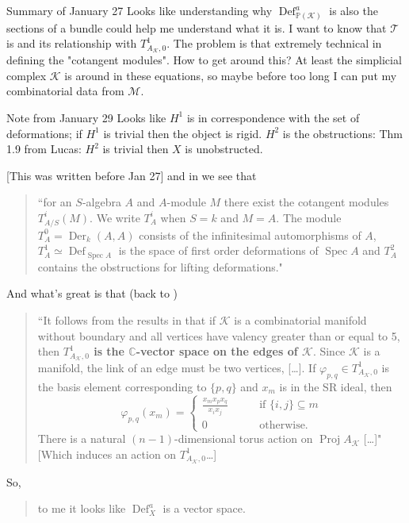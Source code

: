 \begin{thing2}{Summary of January 27}\leavevmode
Looks like understanding why \(\operatorname{Def}^a_{\mathbb{P}(\mathcal{K})}\) is also the sections of a bundle could help me understand what it is. I want to know that \(\mathcal{T}\) is and its relationship with \(T^1_{A_{\mathcal{K}},0}\). The problem is that \cite{def0} extremely technical in defining the "cotangent modules". How to get around this? At least the simplicial complex \(\mathcal{K}\) is around in these equations, so maybe before too long I can put my combinatorial data from \(\mathcal{M}\).
\end{thing2}

\begin{thing5}{Note from January 29}\leavevmode
Looks like \(H^1\) is in correspondence with the set of deformations; if  \(H^1\) is trivial then the object is rigid. \(H^2\) is the obstructions: Thm 1.9 from Lucas: \(H^2\) is trivial then \(X\) is unobstructed.
\end{thing5}

[This was written before Jan 27] and in \cite{jan2} we see that
\begin{quotation}
	``for an \(S\)-algebra \(A\) and \(A\)-module \(M\) there exist the cotangent modules \(T^i_{A/S}(M)\). We write \(T^i_A\) when \(S=k\) and \(M=A\). The module \(T^0_A=\operatorname{Der}_k(A,A)\) consists of the infinitesimal automorphisms of \(A\), \(T^1_A \simeq \operatorname{Def}_{\operatorname{Spec}A}\) is the space of first order deformations of \(\operatorname{Spec}A\) and \(T^2_A\) contains the obstructions for lifting deformations."
\end{quotation}
\label{varphis}
And what's great is that (back to  \cite{jan1})
\begin{quotation}
	``It follows from the results in \cite{jan2} that if \( \mathcal{K}\) is a combinatorial manifold without boundary and all vertices have valency greater than or equal to 5, then \textbf{\(T^1_{A_\mathcal{K},0}\) is the $\mathbb{C}$-vector space on the edges of \(\mathcal{K}\)}. Since \(\mathcal{K}\) is a manifold, the link of an edge must be two vertices, […]. If \(\varphi_{p,q} \in T^1_{A_\mathcal{K},0}\) is the basis element corresponding to \(\{p,q\}\) and \(x_m\) is in the SR ideal, then 
\[\varphi_{p,q}(x_m)=\begin{cases}
	\frac{x_mx_px_q}{x_ix_j}\qquad &\text{if \(\{i,j\}\subseteq m\)}  \\
	0\qquad &\text{otherwise.} 
\end{cases}\]
There is a natural \((n-1)\)-dimensional torus action on \(\operatorname{Proj}A_\mathcal{K}\) […]" [Which induces an action on \(T^1_{A_{\mathcal{K}},0}\)…]
\end{quotation}
So,
\begin{quotation}
	{\color{6}to me it looks like \(\operatorname{Def}_X^a\) is a vector space.}
\end{quotation}

